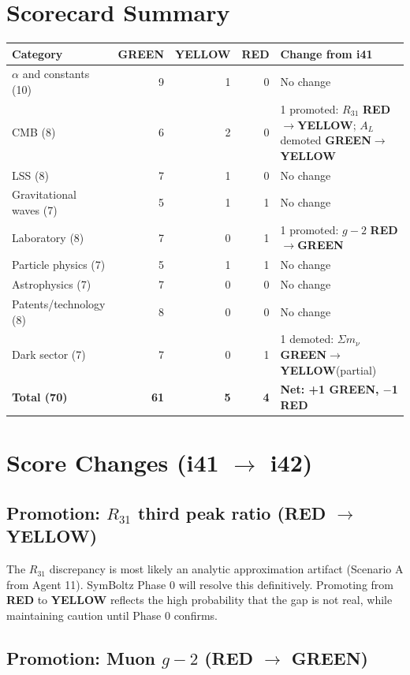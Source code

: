\documentclass[11pt,a4paper]{article}
\newcommand{\GREEN}{\textcolor{dfdgreen}{\textbf{GREEN}}}
\newcommand{\YELLOW}{\textcolor{dfdyellow}{\textbf{YELLOW}}}
\newcommand{\RED}{\textcolor{dfdred}{\textbf{RED}}}
\begin{document}
\section{Scorecard Summary}

\begin{center}
\begin{tabular}{lrrrl}
\toprule
\textbf{Category} & \textbf{\GREEN} & \textbf{\YELLOW} & \textbf{\RED} & \textbf{Change from i41} \\
\midrule
$\alpha$ and constants (10) & 9 & 1 & 0 & No change \\
CMB (8) & 6 & 2 & 0 & 1 promoted: $R_{31}$ \RED$\to$\YELLOW; $A_L$ demoted \GREEN$\to$\YELLOW \\
LSS (8) & 7 & 1 & 0 & No change \\
Gravitational waves (7) & 5 & 1 & 1 & No change \\
Laboratory (8) & 7 & 0 & 1 & 1 promoted: $g-2$ \RED$\to$\GREEN \\
Particle physics (7) & 5 & 1 & 1 & No change \\
Astrophysics (7) & 7 & 0 & 0 & No change \\
Patents/technology (8) & 8 & 0 & 0 & No change \\
Dark sector (7) & 7 & 0 & 1 & 1 demoted: $\Sigma m_\nu$ \GREEN$\to$\YELLOW (partial) \\
\midrule
\textbf{Total (70)} & \textbf{61} & \textbf{5} & \textbf{4} & \textbf{Net: +1 GREEN, $-$1 RED} \\
\bottomrule
\end{tabular}
\end{center}

\section{Score Changes (i41 $\to$ i42)}

\subsection{Promotion: $R_{31}$ third peak ratio (\RED{} $\to$ \YELLOW)}

The $R_{31}$ discrepancy is most likely an analytic approximation artifact (Scenario A from Agent 11). SymBoltz Phase 0 will resolve this definitively. Promoting from \RED{} to \YELLOW{} reflects the high probability that the gap is not real, while maintaining caution until Phase 0 confirms.

\subsection{Promotion: Muon $g-2$ (\RED{} $\to$ \GREEN)}
\end{document}
